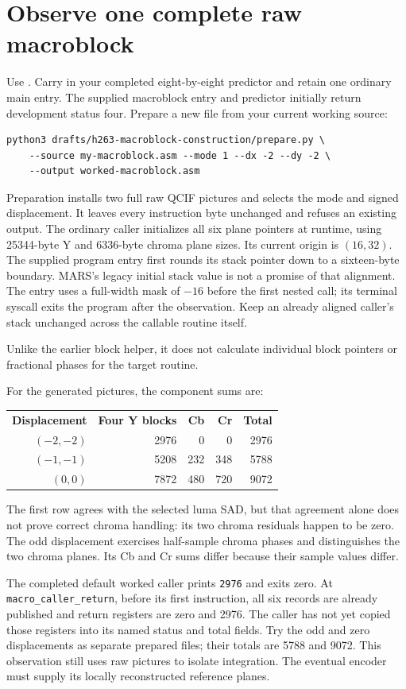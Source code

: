 \section{Observe one complete raw macroblock}
Use . Carry in your completed
eight-by-eight predictor and retain one ordinary main entry. The supplied
macroblock entry and predictor initially return development status four.
Prepare a new file from your current working source:
\begin{verbatim}
python3 drafts/h263-macroblock-construction/prepare.py \
    --source my-macroblock.asm --mode 1 --dx -2 --dy -2 \
    --output worked-macroblock.asm
\end{verbatim}
Preparation installs two full raw QCIF pictures and selects the mode and signed
displacement. It leaves every instruction byte unchanged and refuses an existing
output. The ordinary caller initializes all six plane pointers at runtime, using
25344-byte Y and 6336-byte chroma plane sizes. Its current origin is $(16,32)$.
The supplied program entry first rounds its stack pointer down to a sixteen-byte
boundary. MARS's legacy initial stack value is not a promise of that alignment.
The entry uses a full-width mask of $-16$ before the first nested call; its
terminal syscall exits the program after the observation. Keep an already aligned
caller's stack unchanged across the callable routine itself.

Unlike the earlier block helper, it does not calculate individual block pointers
or fractional phases for the target routine.

For the generated pictures, the component sums are:
\begin{center}
  \tagpdfsetup{table/header-rows={1}}
  \begin{tabular}{rrrrr}
    \textbf{Displacement} & \textbf{Four Y blocks} & \textbf{Cb} & \textbf{Cr} & \textbf{Total} \\
    $(-2,-2)$             & 2976                   & 0           & 0           & 2976           \\
    $(-1,-1)$             & 5208                   & 232         & 348         & 5788           \\
    $(0,0)$               & 7872                   & 480         & 720         & 9072
  \end{tabular}
\end{center}
The first row agrees with the selected luma SAD, but that agreement alone does
not prove correct chroma handling: its two chroma residuals happen to be zero.
The odd displacement exercises half-sample chroma phases and distinguishes the
two chroma planes. Its Cb and Cr sums differ because their sample values differ.

The completed default worked caller prints \texttt{2976} and exits zero.
At \texttt{macro\_caller\_return}, before its first instruction, all six records
are already published and return registers are zero and 2976. The caller has not
yet copied those registers into its named status and total fields. Try the odd
and zero displacements as separate prepared files; their totals are 5788 and 9072.
This observation still uses raw pictures to isolate integration. The eventual
encoder must supply its locally reconstructed reference planes.
